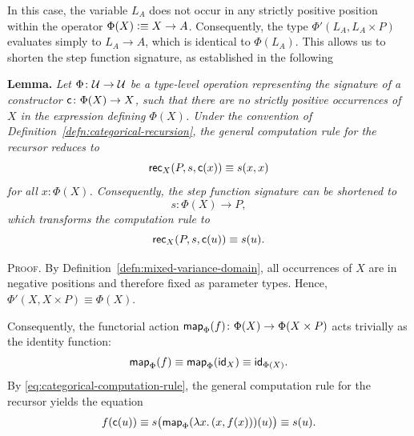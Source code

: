 \begin{solution}
    In this case, the variable $L_A$ does not occur in any strictly positive position within the operator $\Phi(X)\mathrel{\vcentcolon}\equiv X\to A$. Consequently, the type $\Phi'(L_A,L_A\times P)$ evaluates simply to $L_A\to A$, which is identical to $\Phi(L_A)$. This allows us to shorten the step function signature, as established in the following

    \medskip

    \textbf{Lemma.} {\itshape
    Let $\Phi\colon\univ\to\univ$ be a type-level operation representing the signature of a constructor $\fun c\colon\Phi(X)\to X$, such that there are no strictly positive occurrences of $X$ in the expression defining $\Phi(X)$. Under the convention of\/ {\upshape Definition~\ref{defn:categorical-recursion}}, the general computation rule for the recursor reduces to
    \[
        \mathsf{rec}_X(P,s,\mathsf{c}(x))\equiv s(x,x)
    \]
    for all $x\colon\Phi(X)$. Consequently, the step function signature can be shortened to
    \[
        s\colon\Phi(X)\to P,
    \]
    which transforms the computation rule to
    \[
        \mathsf{rec}_X(P,s,\mathsf{c}(u))\equiv s(u).
    \]
    }

    \textsc{Proof.}
    By Definition~\ref{defn:mixed-variance-domain}, all occurrences of $X$ are in negative positions and therefore fixed as parameter types. Hence, $\Phi'(X,X\times P)\equiv\Phi(X)$.

    Consequently, the functorial action $\fun{map}_\Phi(f)\colon\Phi(X)\to\Phi(X\times P)$ acts trivially as the identity function:
    \[
        \mathsf{map}_\Phi(f)
            \equiv\mathsf{map}_\Phi(\mathsf{id}_X)
            \equiv\mathsf{id}_{\Phi(X)}.
    \]
    By \eqref{eq:categorical-computation-rule}, the general computation rule for the recursor yields the equation
    \[
        f(\mathsf{c}(u))
            \equiv s
            \bigl(
                \mathsf{map}_\Phi
                    (\lambda x.\,(x,f(x)))(u)
            \bigr)
            \equiv s(u).
    \]
    \localqed

    \medskip


\end{solution}
